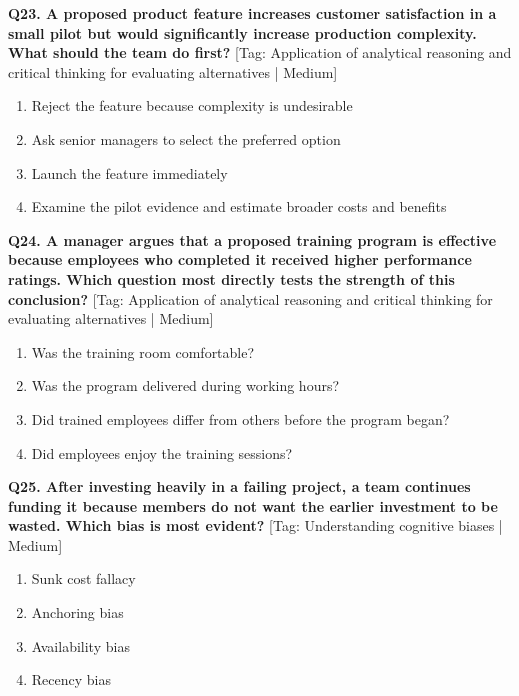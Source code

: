 \noindent\textbf{Q23. A proposed product feature increases customer satisfaction in a small pilot but would significantly increase production complexity. What should the team do first?} \hfill [Tag: Application of analytical reasoning and critical thinking for evaluating alternatives | Medium]
\begin{enumerate}[label=(\alph*),topsep=2pt,itemsep=1pt,partopsep=0pt,parsep=0pt]
    \item {Reject the feature because complexity is undesirable}
    \item {Ask senior managers to select the preferred option}
    \item {Launch the feature immediately}
    \item {Examine the pilot evidence and estimate broader costs and benefits}
\end{enumerate}
\vspace{2mm}

\noindent\textbf{Q24. A manager argues that a proposed training program is effective because employees who completed it received higher performance ratings. Which question most directly tests the strength of this conclusion?} \hfill [Tag: Application of analytical reasoning and critical thinking for evaluating alternatives | Medium]
\begin{enumerate}[label=(\alph*),topsep=2pt,itemsep=1pt,partopsep=0pt,parsep=0pt]
    \item {Was the training room comfortable?}
    \item {Was the program delivered during working hours?}
    \item {Did trained employees differ from others before the program began?}
    \item {Did employees enjoy the training sessions?}
\end{enumerate}
\vspace{2mm}

\noindent\textbf{Q25. After investing heavily in a failing project, a team continues funding it because members do not want the earlier investment to be wasted. Which bias is most evident?} \hfill [Tag: Understanding cognitive biases | Medium]
\begin{enumerate}[label=(\alph*),topsep=2pt,itemsep=1pt,partopsep=0pt,parsep=0pt]
    \item {Sunk cost fallacy}
    \item {Anchoring bias}
    \item {Availability bias}
    \item {Recency bias}
\end{enumerate}
\vspace{2mm}

